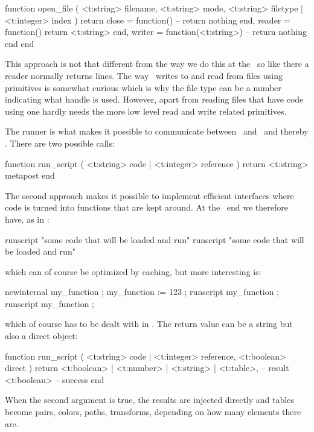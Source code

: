 \starttyping[option=LUA]
function open_file (
    <t:string> filename,
    <t:string> mode,
    <t:string> filetype | <t:integer> index
)
    return {
        close  = function()
            -- return nothing
        end,
        reader = function()
            return <t:string>
        end,
        writer = function(<t:string>)
            -- return nothing
        end
    }
end
\stoptyping

This approach is not that different from the way we do this at the \TEX\ so like
there a reader normally returns lines. The way \METAPOST\ writes to and read from
files using primitives is somewhat curious which is why the file type can be a
number indicating what handle is used. However, apart from reading files that
have code using  one hardly needs the more low level
read and write related primitives.

The runner is what makes it possible to communicate between \METAPOST\ and
\LUA\ and thereby \TEX. There are two possible calls:

\starttyping[option=LUA]
function run_script ( <t:string> code | <t:integer> reference )
    return <t:string> metapost
end
\stoptyping

The second approach makes it possible to implement efficient interfaces where
code is turned into functions that are kept around. At the \METAPOST\ end we
therefore have, as in \LUATEX:

\starttyping[option=MP]
runscript "some code that will be loaded and run"
runscript "some code that will be loaded and run"
\stoptyping

which can of course be optimized by caching, but more interesting is:

\starttyping[option=MP]
newinternal my_function ; my_function := 123 ;
runscript my_function ;
runscript my_function ;
\stoptyping

which of course has to be dealt with in \LUA. The return value can be a string but also
a direct object:

\starttyping[option=LUA]
function run_script (
    <t:string> code | <t:integer> reference,
    <t:boolean> direct
)
    return
        <t:boolean> | <t:number> | <t:string> | <t:table>, -- result
        <t:boolean>                                        -- success
end
\stoptyping

When the second argument is true, the results are injected directly and tables
become pairs, colors, paths, transforms, depending on how many elements there
are.

